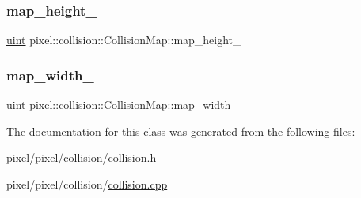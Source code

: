 \subsubsection{\texorpdfstring{map\+\_\+height\+\_\+}{map\_height\_}}
{\footnotesize\ttfamily \hyperlink{namespacepixel_a6706355faabffaabebd430b2fa55843a}{uint} pixel\+::collision\+::\+Collision\+Map\+::map\+\_\+height\+\_\+\hspace{0.3cm}{\ttfamily [private]}}

\mbox{\label{classpixel_1_1collision_1_1_collision_map_a64495af476c19c01be52af4312d147d5}} 
\subsubsection{\texorpdfstring{map\+\_\+width\+\_\+}{map\_width\_}}
{\footnotesize\ttfamily \hyperlink{namespacepixel_a6706355faabffaabebd430b2fa55843a}{uint} pixel\+::collision\+::\+Collision\+Map\+::map\+\_\+width\+\_\+\hspace{0.3cm}{\ttfamily [private]}}



The documentation for this class was generated from the following files\+:\begin{DoxyCompactItemize}
\item 
pixel/pixel/collision/\hyperlink{collision_8h}{collision.\+h}\item 
pixel/pixel/collision/\hyperlink{collision_8cpp}{collision.\+cpp}\end{DoxyCompactItemize}

